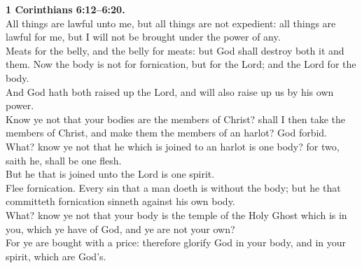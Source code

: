 \documentclass[10pt]{article} %
\begin{document}
{\begin{minipage}[t]{0.45\textwidth}
\textbf{1 Corinthians 6:12--6:20.}\\
All things are lawful unto me, but all things are not expedient: all things are lawful for me, but I will not be brought under the power of any.\\
Meats for the belly, and the belly for meats: but God shall destroy both it and them. Now the body is not for fornication, but for the Lord; and the Lord for the body.\\
And God hath both raised up the Lord, and will also raise up us by his own power.\\
Know ye not that your bodies are the members of Christ? shall I then take the members of Christ, and make them the members of an harlot? God forbid.\\
What? know ye not that he which is joined to an harlot is one body? for two, saith he, shall be one flesh.\\
But he that is joined unto the Lord is one spirit.\\
Flee fornication. Every sin that a man doeth is without the body; but he that committeth fornication sinneth against his own body.\\
What? know ye not that your body is the temple of the Holy Ghost which is in you, which ye have of God, and ye are not your own?\\
For ye are bought with a price: therefore glorify God in your body, and in your spirit, which are God's.\\

\end{minipage}}
\vspace*{\fill}
\newpage
\Huge%
\vspace*{\fill}
\begin{spacing}{1.1}%
\end{spacing}
\vspace*{\fill}
\end{document}
